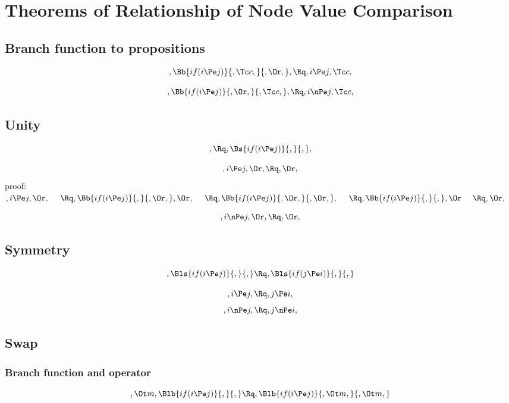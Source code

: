 
 \chapter{Theorems of Relationship of Node Value Comparison}
 \section{Branch function to propositions}
 \[, \Bb{if(i  \Pe j)}{, \Tc c,}{, \Or,},  \Rq ,i  \Pe j,  \Tc c, \]

 \bigskip
 \bigskip
 \[, \Bb{if(i  \Pe j)}{, \Or,}{, \Tc c,},  \Rq ,i  \nPe j,  \Tc c, \]



 \bigskip
 \bigskip
 \bigskip
 \bigskip

 \section{Unity}
 \[,  \Rq ,  \Bs{if(i  \Pe j)}{,}{,}, \]

 \[, i  \Pe j,  \Or,  \Rq ,  \Or, \]
 \bigskip
 \bigskip
 \bigskip
 \bigskip
proof:  \\
 \begin{math} 
, i  \Pe j,  \Or,   \  \  \  \
 \Rq,   \Bb{if(i  \Pe j)}{,}{, \Or,},  \Or,  \  \  \  \
 \Rq,   \Bb{if(i  \Pe j)}{,  \Or,}{, \Or,},  \  \  \  \
 \Rq,   \Bb{if(i  \Pe j)}{,}{,}, \Or  \  \  \  \
 \Rq,  \Or,
 \end{math}


 \[, i  \nPe j,  \Or,  \Rq ,  \Or, \]



 \bigskip
 \bigskip
 \bigskip
 \bigskip
 \section{Symmetry}
 \[,  \Bls{if(i \Pe j)}{,}{,}  \Rq ,  \Bls{if(j  \Pe i)}{,}{,}  \]

 \[, i  \Pe j,  \Rq , j  \Pe i, \]
 \[, i  \nPe j,  \Rq , j  \nPe i, \]


 \bigskip
 \bigskip
 \bigskip
 \bigskip
 \section {Swap}
 \subsection{Branch function and operator}
 \[, \Ot m, \Blb{if(i \Pe j)}{,}{,}  \Rq ,  \Blb{if(i  \Pe j)}{, \Ot m,}{, \Ot m,} \]

